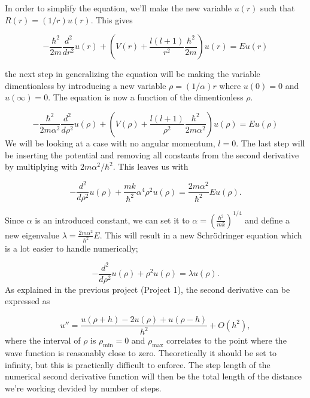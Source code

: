 \documentclass[10pt]{article}
\begin{document}
\begin{multicols}{2}
In order to simplify the equation, we'll make the new variable $u(r)$ such
that $R(r) = (1/r) u(r)$. This gives

\begin{equation*}
  -\frac{\hbar^2}{2 m} \frac{d^2}{dr^2} u(r) + \left ( V(r) + \frac{l (l + 1)}{r^2}\frac{\hbar^2}{2 m}\right ) u(r)  = E u(r)
\end{equation*}

the next step in generalizing the equation will be making the variable
dimentionless by introducing a new variable $\rho = (1/\alpha) r$ where
$u(0)=0$ and $u(\infty)=0$. The equation is now a function of the
dimentionless $\rho$.

\begin{equation*}
  -\frac{\hbar^2}{2 m \alpha^2} \frac{d^2}{d\rho^2} u(\rho)+ \left ( V(\rho) + \frac{l (l + 1)}{\rho^2}\frac{\hbar^2}{2 m\alpha^2} \right ) u(\rho)  = E u(\rho)
\end{equation*}
We will be looking at a case with no angular momentum, $l=0$. The last step
will be inserting the potential and removing all constants from the second
derivative by multiplying with $2m\alpha^2/\hbar^2$. This leaves us with

\begin{equation*}
  -\frac{d^2}{d\rho^2} u(\rho) 
       + \frac{mk}{\hbar^2} \alpha^4\rho^2u(\rho)  = \frac{2m\alpha^2}{\hbar^2}E u(\rho) .
\end{equation*}

Since $\alpha$ is an introduced constant, we can set it to $\alpha  =
\left(\frac{\hbar^2}{mk}\right)^{1/4}$ and define a new eigenvalue $\lambda
= \frac{2m\alpha^2}{\hbar^2}E$. This will result in a new Schrödringer
equation which is a lot easier to handle numerically;

\begin{equation*}
  -\frac{d^2}{d\rho^2} u(\rho) + \rho^2u(\rho)  = \lambda u(\rho) .
\end{equation*}
As explained in the previous project (Project 1), the second derivative can
be expressed as


\begin{equation}
    u''=\frac{u(\rho+h) -2u(\rho) +u(\rho-h)}{h^2} +O(h^2),
    \label{eq:diffoperation}
\end{equation}
where the interval of $\rho$ is $\rho_{\mathrm{min}}=0$ and
$\rho_{\mathrm{max}}$ correlates to the point where the wave function is
reasonably close to zero. Theoretically it should be set to infinity, but
this is practically difficult to enforce. The step length of the numerical
second derivative function will then be the total length of the distance
we're working devided by number of steps.


\end{multicols}
\end{document}
